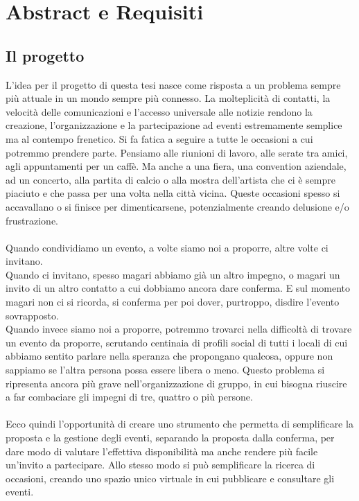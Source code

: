 \newpage
\section{Abstract e Requisiti}

\subsection{Il progetto}

L'idea per il progetto di questa tesi nasce come risposta a un problema sempre più attuale in un mondo sempre più connesso.
La molteplicità di contatti, la velocità delle comunicazioni e l'accesso universale alle notizie 
rendono la creazione, l'organizzazione e la partecipazione ad eventi estremamente semplice ma al contempo frenetico.
Si fa fatica a seguire a tutte le occasioni a cui potremmo prendere parte.
Pensiamo alle riunioni di lavoro, alle serate tra amici, agli appuntamenti per un caffè.
Ma anche a una fiera, una convention aziendale, ad un concerto, alla partita di calcio o alla mostra dell'artista che ci è sempre piaciuto e che passa per una volta nella città vicina.
Queste occasioni spesso si accavallano o si finisce per dimenticarsene, potenzialmente creando delusione e/o frustrazione.\\
\\
Quando condividiamo un evento, a volte siamo noi a proporre, altre volte ci invitano. \\
Quando ci invitano, spesso magari abbiamo già un altro impegno, o magari un invito di un altro contatto a cui dobbiamo ancora dare conferma. 
E sul momento magari non ci si ricorda, si conferma per poi dover, purtroppo, disdire l'evento sovrapposto.\\
Quando invece siamo noi a proporre, potremmo trovarci nella difficoltà di trovare un evento da proporre, 
scrutando centinaia di profili social di tutti i locali di cui abbiamo sentito parlare nella speranza che propongano qualcosa, 
oppure non sappiamo se l'altra persona possa essere libera o meno. 
Questo problema si ripresenta ancora più grave nell'organizzazione di gruppo, in cui bisogna riuscire a far combaciare gli impegni di tre, quattro o più persone.\\
\\
Ecco quindi l'opportunità di creare uno strumento che permetta di semplificare la proposta e la gestione degli eventi, 
separando la proposta dalla conferma, per dare modo di valutare l'effettiva disponibilità ma anche rendere più facile un'invito a partecipare.
Allo stesso modo si può semplificare la ricerca di occasioni, creando uno spazio unico virtuale in cui pubblicare e consultare gli eventi.\\
